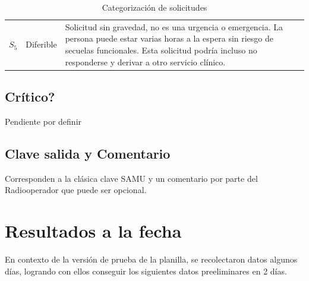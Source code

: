 \documentclass{article}
\begin{document}
\begin{table}[H]
\begin{tabular}{c l p{9cm} }
\\ 
\rowcolor[HTML]{EFEFEF} 
$S{_5}$                    & Diferible                      
& Solicitud sin gravedad, no es una urgencia o emergencia. La persona puede estar varias horas a la espera sin riesgo de secuelas funcionales. Esta solicitud podr\'ia incluso no responderse y derivar a otro servicio clínico. 
\\
\end{tabular}
\caption{Categorizaci\'on de solicitudes}
\end{table}

\subsection{Crítico?}
Pendiente por definir

\subsection{Clave salida y Comentario}
Corresponden a la clásica clave SAMU y un comentario por parte del Radiooperador que puede ser opcional.

\section{Resultados a la fecha}

En contexto de la versión de prueba de la planilla, se recolectaron datos algunos días, logrando con ellos conseguir los siguientes datos preeliminares en 2 días.
\end{document}
